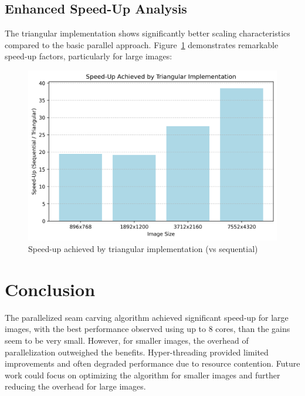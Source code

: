 \documentclass[9pt]{IEEEtran}
\begin{document}
\subsection{Enhanced Speed-Up Analysis}
The triangular implementation shows significantly better scaling characteristics compared to the basic parallel approach. Figure~\ref{fig:speedup-triangular} demonstrates remarkable speed-up factors, particularly for large images:

\begin{figure}[h]
    \centering
    \includegraphics[width=1\columnwidth]{speedup_triangular.png}
    \caption{Speed-up achieved by triangular implementation (vs sequential)}
    \label{fig:speedup-triangular}
\end{figure}

\section{Conclusion}

The parallelized seam carving algorithm achieved significant speed-up for large images, with the best performance observed using up to 8 cores, than the gains seem to be very small. However, for smaller images, the overhead of parallelization outweighed the benefits. Hyper-threading provided limited improvements and often degraded performance due to resource contention. Future work could focus on optimizing the algorithm for smaller images and further reducing the overhead for large images.



\end{document}
